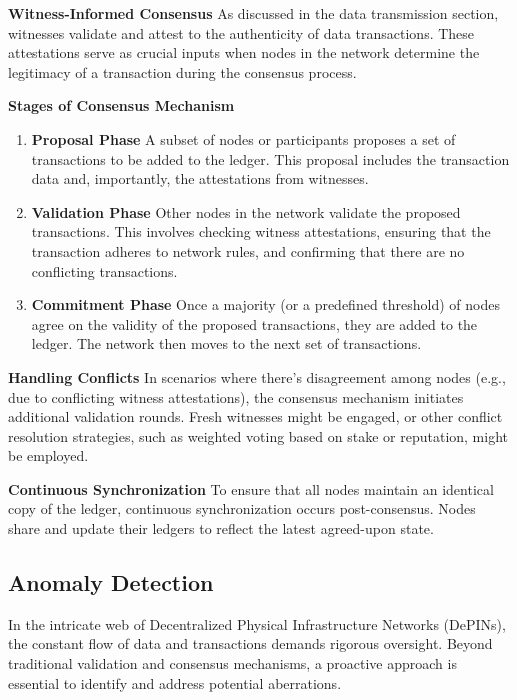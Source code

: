 \documentclass{article}
\begin{document}
\textbf{Witness-Informed Consensus}
As discussed in the data transmission section, witnesses validate and attest to the authenticity of data transactions. These attestations serve as crucial inputs when nodes in the network determine the legitimacy of a transaction during the consensus process.

\textbf{Stages of Consensus Mechanism}
\begin{enumerate}

\item \textbf{Proposal Phase} A subset of nodes or participants proposes a set of transactions to be added to the ledger. This proposal includes the transaction data and, importantly, the attestations from witnesses.

\item \textbf{Validation Phase} Other nodes in the network validate the proposed transactions. This involves checking witness attestations, ensuring that the transaction adheres to network rules, and confirming that there are no conflicting transactions.

\item \textbf{Commitment Phase} Once a majority (or a predefined threshold) of nodes agree on the validity of the proposed transactions, they are added to the ledger. The network then moves to the next set of transactions.
\end{enumerate}

\textbf{Handling Conflicts} In scenarios where there's disagreement among nodes (e.g., due to conflicting witness attestations), the consensus mechanism initiates additional validation rounds. Fresh witnesses might be engaged, or other conflict resolution strategies, such as weighted voting based on stake or reputation, might be employed.

\textbf{Continuous Synchronization} To ensure that all nodes maintain an identical copy of the ledger, continuous synchronization occurs post-consensus. Nodes share and update their ledgers to reflect the latest agreed-upon state.

\subsection{Anomaly Detection}

In the intricate web of Decentralized Physical Infrastructure Networks (DePINs), the constant flow of data and transactions demands rigorous oversight. Beyond traditional validation and consensus mechanisms, a proactive approach is essential to identify and address potential aberrations. 
\end{document}

